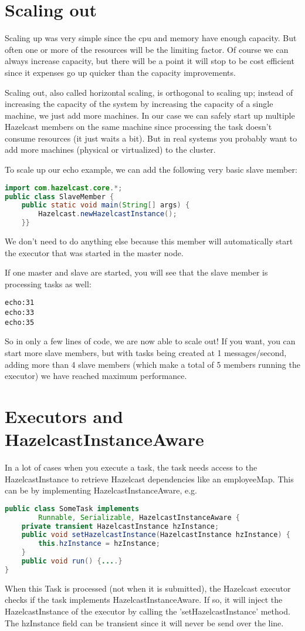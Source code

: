\section{Scaling out}
Scaling up was very simple since the cpu and memory have enough capacity. But often one or more of the resources will be the limiting factor. Of course we can always increase capacity, but there will be a point it will stop to be cost efficient since it expenses go up quicker than the capacity improvements.

Scaling out, also called horizontal scaling, is orthogonal to scaling up; instead of increasing the capacity of the system by increasing the capacity of a single machine, we just add more machines. In our case we can safely start up multiple Hazelcast members on the same machine since processing the task doesn't consume resources (it just waits a bit). But in real systems you probably want to add more machines (physical or virtualized) to the cluster.

To scale up our echo example, we can add the following very basic slave member:
\begin{lstlisting}[language=java]
import com.hazelcast.core.*;
public class SlaveMember {
    public static void main(String[] args) {
        Hazelcast.newHazelcastInstance();
    }}
\end{lstlisting}
We don't need to do anything else because this member will automatically start the executor that was started in the master node.

If one master and slave are started, you will see that the slave member is processing tasks as well:
\begin{lstlisting}
echo:31
echo:33
echo:35	
\end{lstlisting}
So in only a few lines of code, we are now able to scale out! If you want, you can start more slave members, but with tasks being created at 1 messages/second, adding more than 4 slave members (which make a total of 5 members running the executor) we have reached maximum performance. 

\section{Executors and HazelcastInstanceAware}
In a lot of cases when you execute a task, the task needs access to the HazelcastInstance to retrieve Hazelcast dependencies like an employeeMap. This can be by implementing HazelcastInstanceAware, e.g.

\begin{lstlisting}[language=java]
public class SomeTask implements
        Runnable, Serializable, HazelcastInstanceAware {
    private transient HazelcastInstance hzInstance;
    public void setHazelcastInstance(HazelcastInstance hzInstance) {
        this.hzInstance = hzInstance;
    }
    public void run() {....}
}
\end{lstlisting}
When this Task is processed (not when it is submitted), the Hazelcast executor checks if the task implements HazelcastInstanceAware. If so, it will inject the HazelcastInstance of the executor by calling the 'setHazelcastInstance' method. The hzInstance field can be transient since it will never be send over the line. 

